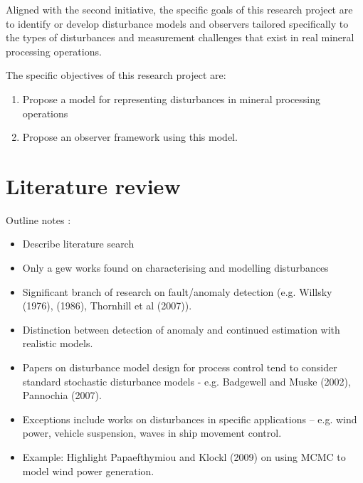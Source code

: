Aligned with the second initiative, the specific goals of this research project are to identify or develop disturbance models and observers tailored specifically to the types of disturbances and measurement challenges that exist in real mineral processing operations.

The specific objectives of this research project are:

\begin{enumerate}
	\item Propose a model for representing disturbances in mineral processing operations
	\item Propose an observer framework using this model.
\end{enumerate}

\section*{Literature review}

Outline notes :

\begin{itemize}
	\item Describe literature search
	\item Only a gew works found on characterising and modelling disturbances
	\item Significant branch of research on fault/anomaly detection (e.g. Willsky (1976), (1986), Thornhill et al (2007)).
	\item Distinction between detection of anomaly and continued estimation with realistic models.
	\item Papers on disturbance model design for process control tend to consider standard stochastic disturbance models - e.g. Badgewell and Muske (2002), Pannochia (2007).
	\item Exceptions include works on disturbances in specific applications – e.g. wind power, vehicle suspension, waves in ship movement control.
	\item Example: Highlight Papaefthymiou and Klockl (2009) on using MCMC to model wind power generation.
\end{itemize}


